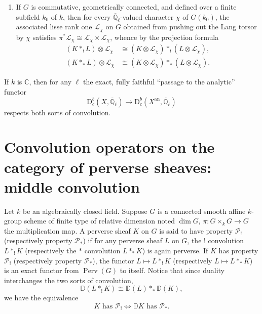 \begin{enumerate}[label=(\arabic*)]
\[\begin{aligned}
  (T_g)_*(L)&\cong(\delta_g)*L.
\end{aligned}
\]
Moreover, if \(G\) is commutative, then for \(g,h\) in \(G(k)\), we have
\[
\begin{aligned}
  (T_{gh})_*(K*_*L)&\cong((T_g)_*K)*_*((T_h)_*L),\\
  (T_{gh})_*(K*_!L)&\cong((T_g)_*K)*_!((T_h)_*L).
\end{aligned}
\]
\item If \(G\) is commutative, geometrically connected, and defined over a
finite subfield \(k_0\) of \(k\), then for every
\(\overline{\mathbb{Q}}_\ell\)-valued character \(\chi\) of \(G(k_0)\), the
associated lisse rank one \(\mathcal{L}_\chi\) on \(G\) obtained from pushing
out the Lang torsor by \(\chi\) satisfies
\(\pi^*\mathcal{L}_\chi\cong\mathcal{L}_\chi\times\mathcal{L}_\chi\), whence
by the projection formula
\[
\begin{aligned}
  (K*_!L)\otimes\mathcal{L}_\chi
  &\cong(K\otimes\mathcal{L}_\chi)*_!(L\otimes\mathcal{L}_\chi),\\
  (K*_*L)\otimes\mathcal{L}_\chi
  &\cong(K\otimes\mathcal{L}_\chi)*_*(L\otimes\mathcal{L}_\chi).
\end{aligned}
\]
\end{enumerate}

If \(k\) is \(\mathbb{C}\), then for any \(\ell\) the exact, fully faithful
``passage to the analytic'' functor
\[
  \mathrm{D}^b_c(X,\overline{\mathbb{Q}}_\ell)\to
  \mathrm{D}^b_c(X^{\mathrm{an}},\overline{\mathbb{Q}}_\ell)
\]
respects both sorts of convolution.

\section[Convolution operators: middle convolution]{Convolution operators on the category of perverse sheaves: middle
convolution}\label{sec:2.6}

Let \(k\) be an algebraically closed field. Suppose \(G\) is a connected smooth
affine \(k\)-group scheme of finite type of relative dimension noted
\(\dim G\), \(\pi:G\times_kG\to G\) the multiplication map. A perverse sheaf
\(K\) on \(G\) is said to have property \(\mathcal{P}_!\) (respectively
property \(\mathcal{P}_*\)) if for any perverse sheaf \(L\) on \(G\), the
\(!\) convolution \(L*_!K\) (respectively the \(*\) convolution \(L*_*K\)) is
again perverse. If \(K\) has property \(\mathcal{P}_!\) (respectively property
\(\mathcal{P}_*\)), the functor \(L\mapsto L*_!K\) (respectively
\(L\mapsto L*_*K\)) is an exact functor from \(\operatorname{Perv}(G)\) to
itself. Notice that since duality interchanges the two sorts of convolution,
\[
  \mathbb{D}(L*_!K)\cong\mathbb{D}(L)*_*\mathbb{D}(K),
\]
we have the equivalence
\[
  K\text{ has }\mathcal{P}_!\Longleftrightarrow
  \mathbb{D}K\text{ has }\mathcal{P}_*.
\]

